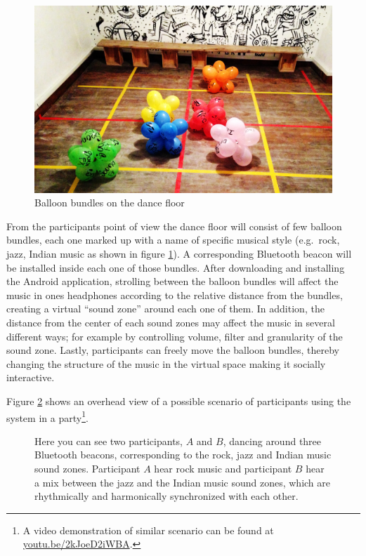 \documentclass[a4paper,11pt]{article}
\begin{document}
\begin{figure}[!htb]
	\includegraphics[width=\linewidth]{balloons}
	\caption{Balloon bundles on the dance floor}\label{fig:balloons}
\end{figure}

From the participants point of view the dance floor will consist of few balloon bundles, each one marked up with a name of specific musical style (e.g.\ rock, jazz, Indian music as shown in figure \ref{fig:balloons}).
A corresponding Bluetooth beacon will be installed inside each one of those bundles.
After downloading and installing the Android application, strolling between the balloon bundles will affect the music in ones headphones according to the relative distance from the bundles, creating a virtual ``sound zone'' around each one of them.
In addition, the distance from the center of each sound zones may affect the music in several different ways; for example by controlling volume, filter and granularity of the sound zone.
Lastly, participants can freely move the balloon bundles, thereby changing the structure of the music in the virtual space making it socially interactive.

Figure \ref{fig:sys:participant_view} shows an overhead view of a possible scenario of participants using the system in a party\footnote{A video demonstration of similar scenario can be found at \href{http://youtu.be/2kJoeD2iWBA}{youtu.be/2kJoeD2iWBA}.}.

\begin{figure}[!htb]
	\centering
	\def\svgwidth{0.9\textwidth}
	
	\caption{Here you can see two participants, $A$ and $B$, dancing around three Bluetooth beacons, corresponding to the rock, jazz and Indian music sound zones. Participant $A$ hear rock music and participant $B$ hear a mix between the jazz and the Indian music sound zones, which are rhythmically and harmonically synchronized with each other.}\label{fig:sys:participant_view}
\end{figure}
\end{document}
